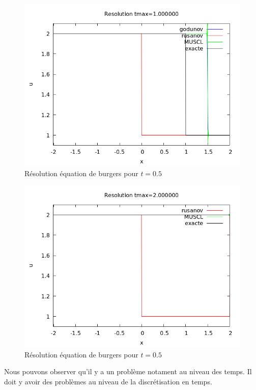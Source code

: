 \documentclass{article}
\begin{document}
\begin{figure}[H]
	\centering
	\includegraphics[scale=0.5]{figure/burgers_2.png}
	\caption{Résolution équation de burgers pour $t=0.5$}
\end{figure} 

\begin{figure}[H]
	\centering
	\includegraphics[scale=0.5]{figure/burgers_3.png}
	\caption{Résolution équation de burgers pour $t=0.5$}
\end{figure}

Nous pouvons observer qu'il y a un problème notament au niveau des temps. Il doit y avoir 
des problèmes au niveau de la discrétisation en temps. 
\newline
\end{document}
